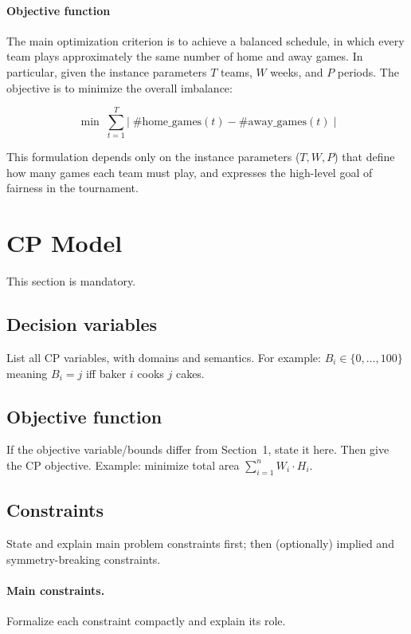 \documentclass{article}
\begin{document}
\paragraph{Objective function}

The main optimization criterion is to achieve a balanced schedule,
in which every team plays approximately the same number of home and away
games. In particular, given the instance parameters 
$T$ teams, $W$ weeks, and $P$ periods.
The objective is to minimize the overall imbalance:

\[
\min \; \sum_{t=1}^{T} \Big| \; 
\#\text{home\_games}(t) - \#\text{away\_games}(t) \; \Big|
\]

This formulation depends only on the instance parameters
($T, W, P$) that define how many games each team must play,
and expresses the high-level goal of fairness in the tournament.




\section{CP Model}
This section is mandatory.

\subsection{Decision variables}
List all CP variables, with domains and semantics.
For example: $B_i \in \{0,\dots,100\}$ meaning $B_i = j$ iff baker $i$ cooks $j$ cakes.

\subsection{Objective function}
If the objective variable/bounds differ from Section~1, state it here.
Then give the CP objective. Example: minimize total area
$ \sum_{i=1}^{n} W_i \cdot H_i $.

\subsection{Constraints}
State and explain main problem constraints first; then (optionally) implied and symmetry-breaking constraints.

\paragraph{Main constraints.}
Formalize each constraint compactly and explain its role.
\end{document}
